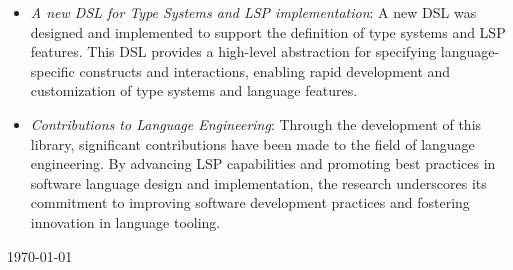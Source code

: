 \documentclass{adapt-lab}
\begin{document}
\begin{itemize}
    \item \textit{A new DSL for Type Systems and LSP implementation}: A new DSL was designed and implemented to support the definition of type systems and LSP features. This DSL provides a high-level abstraction for specifying language-specific constructs and interactions, enabling rapid development and customization of type systems and language features.
    \item \textit{Contributions to Language Engineering}: Through the development of this library, significant contributions have been made to the field of language engineering. By advancing LSP capabilities and promoting best practices in software language design and implementation, the research underscores its commitment to improving software development practices and fostering innovation in language tooling.
\end{itemize}


\begingroup
\let\clearpage\relax


\endgroup

\nocite{Cazzola20}
\nocite{Cazzola21b, Cazzola15f}
\nocite{Leduc20}
\nocite{Cazzola15c, Cazzola14c}
\nocite{Cazzola15f, Cazzola21b}
\nocite{Fowler10}
\nocite{Barros22}
\nocite{Bunder19a}
\nocite{Rodriguez-Echeverria18a}
\nocite{Cazzola20}
\nocite{Rodriguez-Echeverria18}
\nocite{Cazzola23d, Cazzola20}
\nocite{Cazzola15f}
\nocite{Cazzola15f}
\nocite{Cazzola16, Cazzola16i, Cazzola15f}
\nocite{Haugen08, Cazzola14e, White09}
\nocite{Cazzola15c, Cazzola14c}
\nocite{Cazzola19}

\vspace*{\fill}
\begin{flushright}
    \today %
\end{flushright}

%
% 
% 
\end{document}
